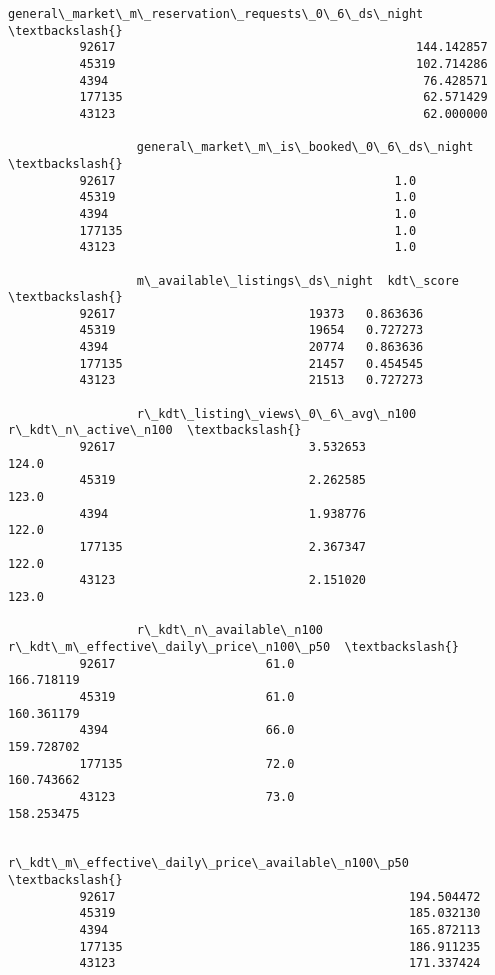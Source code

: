 \documentclass[11pt]{article}
\begin{document}
\begin{Verbatim}[commandchars=\\\{\}]
                  general\_market\_m\_reservation\_requests\_0\_6\_ds\_night  \textbackslash{}
          92617                                          144.142857    
          45319                                          102.714286    
          4394                                            76.428571    
          177135                                          62.571429    
          43123                                           62.000000    
          
                  general\_market\_m\_is\_booked\_0\_6\_ds\_night  \textbackslash{}
          92617                                       1.0   
          45319                                       1.0   
          4394                                        1.0   
          177135                                      1.0   
          43123                                       1.0   
          
                  m\_available\_listings\_ds\_night  kdt\_score  \textbackslash{}
          92617                           19373   0.863636   
          45319                           19654   0.727273   
          4394                            20774   0.863636   
          177135                          21457   0.454545   
          43123                           21513   0.727273   
          
                  r\_kdt\_listing\_views\_0\_6\_avg\_n100  r\_kdt\_n\_active\_n100  \textbackslash{}
          92617                           3.532653                124.0   
          45319                           2.262585                123.0   
          4394                            1.938776                122.0   
          177135                          2.367347                122.0   
          43123                           2.151020                123.0   
          
                  r\_kdt\_n\_available\_n100  r\_kdt\_m\_effective\_daily\_price\_n100\_p50  \textbackslash{}
          92617                     61.0                              166.718119   
          45319                     61.0                              160.361179   
          4394                      66.0                              159.728702   
          177135                    72.0                              160.743662   
          43123                     73.0                              158.253475   
          
                  r\_kdt\_m\_effective\_daily\_price\_available\_n100\_p50  \textbackslash{}
          92617                                         194.504472   
          45319                                         185.032130   
          4394                                          165.872113   
          177135                                        186.911235   
          43123                                         171.337424   
          

\end{Verbatim}
\end{document}
